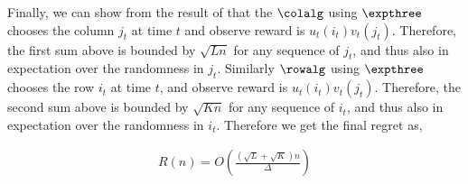 Finally, we can show from the result of \citet{auer2002nonstochastic} that the $\colalg$ using $\expthree$ chooses the column $j_t$ at time $t$ and observe reward is $u_t(i_t) v_t(j_t)$. Therefore, the first sum above is bounded by $\sqrt{L n}$ for any sequence of $j_t$, and thus also in expectation over the randomness in $j_t$. Similarly $\rowalg$ using $\expthree$ chooses the row $i_t$ at time $t$, and observe reward is $u_t(i_t) v_t(j_t)$. Therefore, the second sum above is bounded by $\sqrt{K n}$ for any sequence of $i_t$, and thus also in expectation over the randomness in $i_t$. Therefore we get the final regret as,

\begin{align*}
  R(n) = O\left(\frac{\left(\sqrt{L } + \sqrt{K }\right)n}{\Delta}\right)
\end{align*}



